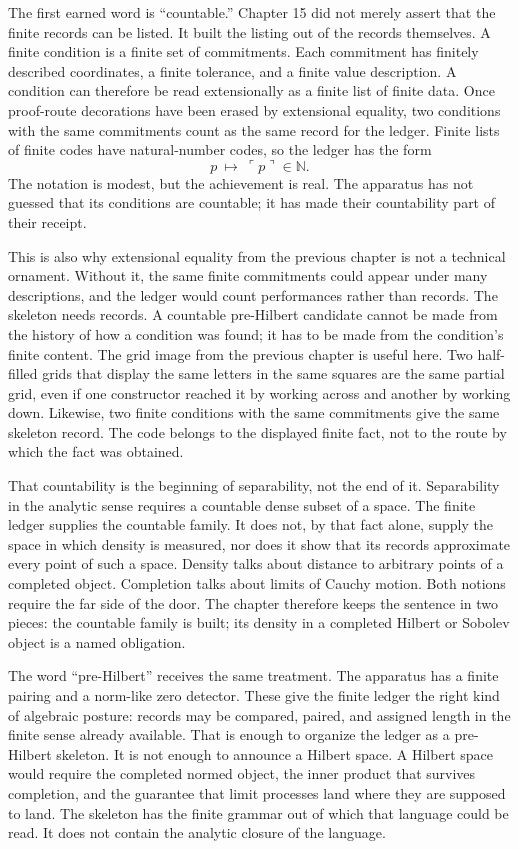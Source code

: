 The first earned word is ``countable.'' Chapter 15 did not merely assert that
the finite records can be listed. It built the listing out of the records
themselves. A finite condition is a finite set of commitments. Each commitment
has finitely described coordinates, a finite tolerance, and a finite value
description. A condition can therefore be read extensionally as a finite list of
finite data. Once proof-route decorations have been erased by extensional
equality, two conditions with the same commitments count as the same record for
the ledger. Finite lists of finite codes have natural-number codes, so the
ledger has the form
\[
  p\ \longmapsto\ \ulcorner p\urcorner \in \mathbb{N}.
\]
The notation is modest, but the achievement is real. The apparatus has not
guessed that its conditions are countable; it has made their countability part
of their receipt.

This is also why extensional equality from the previous chapter is not a
technical ornament. Without it, the same finite commitments could appear under
many descriptions, and the ledger would count performances rather than records.
The skeleton needs records. A countable pre-Hilbert candidate cannot be made
from the history of how a condition was found; it has to be made from the
condition's finite content. The grid image from the previous chapter is useful
here. Two half-filled grids that display the same letters in the same squares
are the same partial grid, even if one constructor reached it by working across
and another by working down. Likewise, two finite conditions with the same
commitments give the same skeleton record. The code belongs to the displayed
finite fact, not to the route by which the fact was obtained.

That countability is the beginning of separability, not the end of it.
Separability in the analytic sense requires a countable dense subset of a space.
The finite ledger supplies the countable family. It does not, by that fact
alone, supply the space in which density is measured, nor does it show that its
records approximate every point of such a space. Density talks about distance
to arbitrary points of a completed object. Completion talks about limits of
Cauchy motion. Both notions require the far side of the door. The chapter
therefore keeps the sentence in two pieces: the countable family is built; its
density in a completed Hilbert or Sobolev object is a named obligation.

The word ``pre-Hilbert'' receives the same treatment. The apparatus has a
finite pairing and a norm-like zero detector. These give the finite ledger the
right kind of algebraic posture: records may be compared, paired, and assigned
length in the finite sense already available. That is enough to organize the
ledger as a pre-Hilbert skeleton. It is not enough to announce a Hilbert space.
A Hilbert space would require the completed normed object, the inner product
that survives completion, and the guarantee that limit processes land where
they are supposed to land. The skeleton has the finite grammar out of which
that language could be read. It does not contain the analytic closure of the
language.

